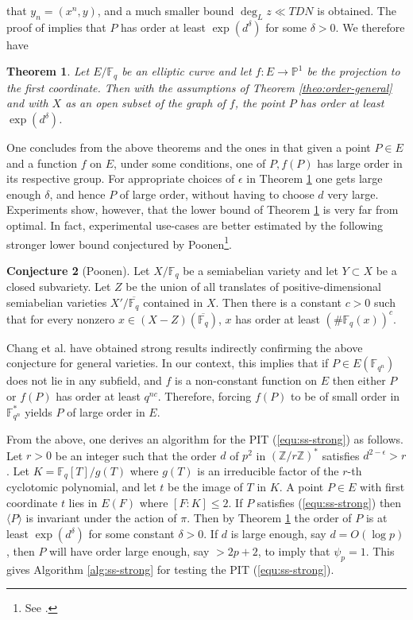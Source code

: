 \documentclass[review]{elsarticle}
\theoremstyle{plain}
\newtheorem{theorem}{Theorem}
\theoremstyle{definition}
\newtheorem{conjecture}[theorem]{Conjecture}
\newcommand{\ang}[1]{\langle#1\rangle}
\def\Z{\ensuremath{\mathbb{Z}}}
\def\F{\ensuremath{\mathbb{F}}}
\begin{document}
that $y_n = (x^n, y)$, and a much smaller bound $\deg_L z \ll TDN$ is obtained. The proof of 
\cite[Theorem 1.1]{voloch2010} implies that $P$ has order at least $\exp(d^\delta)$ for some 
$\delta > 0$. We therefore have
\begin{theorem}
	\label{theo:order-ell}
	Let $E/\F_q$ be an elliptic curve and let $f: E \rightarrow \mathbb{P}^1$ be the projection to 
	the first coordinate. Then with the assumptions of Theorem \ref{theo:order-general} and with 
	$X$ as an open subset of the graph of $f$, the point $P$ has order at least $\exp(d^\delta)$.
\end{theorem}
One concludes from the above theorems and the ones in \cite{voloch2010} that given a point $P \in 
E$ and a function $f$ on $E$, under some conditions, one of $P, f(P)$ has large order in its 
respective group. For appropriate choices of $\epsilon$ in Theorem \ref{theo:order-ell} one gets 
large enough $\delta$, and hence $P$ of large order, without having to choose $d$ very large. 
Experiments show, however, that the lower bound of Theorem \ref{theo:order-ell} is very far from 
optimal. In fact, experimental use-cases are better estimated by the following stronger lower bound 
conjectured by Poonen\footnote{See \cite{voloch2007}.}.
\begin{conjecture}[Poonen]
	\label{conj:poonen}
	Let $X/\F_q$ be a semiabelian variety and let $Y \subset X$ be a closed subvariety. Let $Z$ be 
	the union of all translates of positive-dimensional semiabelian varieties $X'/\overline{\F_q}$ 
	contained in $X$. Then there is a constant $c > 0$ such that for every nonzero $x \in (X - Z) 
	(\overline{\F_q})$, $x$ has order at least $(\#\F_q(x))^c$.
\end{conjecture}
Chang et al.\cite{chang2014} have obtained strong results indirectly confirming the above 
conjecture for general varieties. In our context, this implies that if $P \in E(\F_{q^n})$ does not 
lie in any subfield, and $f$ is a non-constant function on $E$ then either $P$ or $f(P)$ has order 
at least $q^{nc}$. Therefore, forcing $f(P)$ to be of small order in $\F_{q^n}^*$ yields $P$ of 
large order in $E$.

From the above, one derives an algorithm for the PIT (\ref{equ:ss-strong}) as follows. Let $r > 0$ 
be an integer such that the order $d$ of $p^2$ in $(\Z/r\Z)^*$ satisfies $d^{2 - \epsilon} > r$. 
Let $K = \F_q[T]/g(T)$ where $g(T)$ is an irreducible factor of the  $r$-th cyclotomic 
polynomial, and let $t$ be the image of $T$ in $K$. A point $P \in E$ with first coordinate $t$ 
lies in $E(F)$ where $[F : K] \le 2$. If $P$ satisfies (\ref{equ:ss-strong}) then $\ang{P}$ is 
invariant under the action of $\pi$. Then by Theorem \ref{theo:order-ell} the order of $P$ is at 
least $\exp(d^\delta)$ for some constant $\delta > 0$. If $d$ is large enough, say $d = O(\log p)$, 
then $P$ will have order large enough, say $> 2p + 2$, to imply that $\psi_p = 1$. This gives 
Algorithm \ref{alg:ss-strong} for testing the PIT (\ref{equ:ss-strong}).
\end{document}
